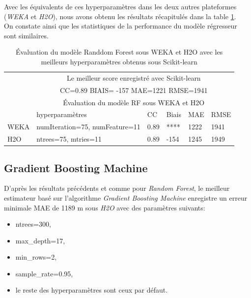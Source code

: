 Avec les équivalents de ces hyperparamètres dans les deux autres plateformes (\textit{WEKA} et \textit{H2O}), nous avons obtenu les résultats récapitulés dans la table \ref{tab:rf_croisé}.\\ 

 On constate ainsi que les statistiques de la performance du modèle régresseur sont similaires.\\

\begin{table}[ht]
    \centering
    \begin{tabular}{ |p{1.6cm}|p{4cm}|p{1.6cm}|p{1.6cm}|p{1.6cm}|p{1.6cm}|  }
     \hline
     & \multicolumn{5}{c|}{Le meilleur score enregistré avec Scikit-learn} \\
     &\multicolumn{5}{c|}{CC=0.89 \hspace{0.2cm} BIAIS= -157 \hspace{0.2cm} MAE=1221 \hspace{0.2cm} RMSE=1941}\\
     \hline
     & \multicolumn{5}{|c|}{Évaluation du modèle RF sous WEKA et H2O} \\
     \hline
     & hyperparamètres & CC & Biais & MAE & RMSE\\
     \hline
     WEKA & numIteration=75, numFeature=11 & 0.89 & **** & 1222 & 1941 \\
     \hline
     H2O & ntrees=75, mtries=11 & 0.89 & -154 & 1245 & 1949 \\
     \hline
    \end{tabular}
    \caption{Évaluation du modèle Randdom Forest sous WEKA et H2O avec les meilleurs hyperparamètres obtenus sous Scikit-learn}
    \label{tab:rf_croisé}
\end{table}

\subsection*{Gradient Boosting Machine}
D'après les résultats précédents et comme pour \textit{Random Forest}, le meilleur estimateur basé sur l'algorithme \textit{Gradient Boosting Machine} enregistre un erreur minimale MAE de 1189 m sous \textit{H2O} avec des paramètres suivants:

\begin{itemize}
    \item[\ding{223}] ntrees=300,
    \item[\ding{223}] max\_depth=17,
    \item[\ding{223}] min\_rows=2,
    \item[\ding{223}] sample\_rate=0.95,
    \item[\ding{223}] le reste des hyperparamètres sont ceux par défaut.\\
\end{itemize}

